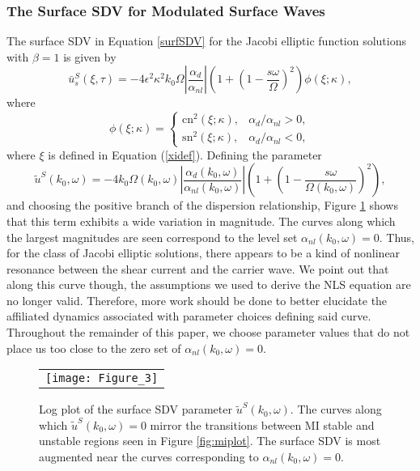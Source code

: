 \documentclass{JFM_Style/jfm}
\newcommand{\ba}{\begin{array}}
\newcommand{\ea}{\end{array}}
\begin{document}
\subsubsection*{The Surface SDV for Modulated Surface Waves}
The surface SDV in Equation \eqref{surfSDV} for the Jacobi elliptic function solutions with $\beta=1$ is given by
\[
\bar{u}^{S}_{s}(\xi,\tau) = -4\epsilon^{2}\kappa^{2}k_{0}\Omega \left|\frac{\alpha_{d}}{\alpha_{nl}}\right| \left(1 + \left(1 - \frac{s\omega}{\Omega} \right)^{2} \right)\phi(\xi;\kappa),
\]
where
\[
\phi(\xi;\kappa) = \left\{\ba{rl} \mbox{cn}^2(\xi;\kappa), & \alpha_{d}/\alpha_{nl}>0, \\  \mbox{sn}^2(\xi;\kappa), & \alpha_{d}/\alpha_{nl}<0,\ea \right.
\]
where $\xi$ is defined in Equation (\ref{xidef}).  Defining the parameter
\[
\tilde{u}^{S}(k_{0},\omega) = -4 k_{0}\Omega(k_{0},\omega) \left|\frac{\alpha_{d}(k_{0},\omega)}{\alpha_{nl}(k_{0},\omega)}\right|\left(1 + \left(1 - \frac{s\omega}{\Omega(k_{0},\omega)} \right)^{2} \right),
\]
and choosing the positive branch of the dispersion relationship, Figure \ref{fig:sdriftmag_sign} shows that this term exhibits a wide variation in magnitude.  The curves along which the largest magnitudes are seen correspond to the level set $\alpha_{nl}(k_{0},\omega)=0$.  Thus, for the class of Jacobi elliptic solutions, there appears to be a kind of nonlinear resonance between the shear current and the carrier wave.  We point out that along this curve though, the assumptions we used to derive the NLS equation are no longer valid.  Therefore, more work should be done to better elucidate the affiliated dynamics associated with parameter choices defining said curve.  Throughout the remainder of this paper, we choose parameter values that do not place us too close to the zero set of $\alpha_{nl}(k_{0},\omega)=0$.
\begin{figure}
\centering
\begin{tabular}{c}
\texttt{[image: Figure\_3]}
\end{tabular}
\caption{\small Log plot of the surface SDV parameter $\tilde{u}^{S}(k_{0},\omega)$.  The curves along which $\tilde{u}^{S}(k_{0},\omega)=0$ mirror the transitions between MI stable and unstable regions seen in Figure \ref{fig:miplot}.  The surface SDV is most augmented near the curves corresponding to $\alpha_{nl}(k_{0},\omega)=0$.  }
\label{fig:sdriftmag_sign}
\end{figure}
\end{document}
